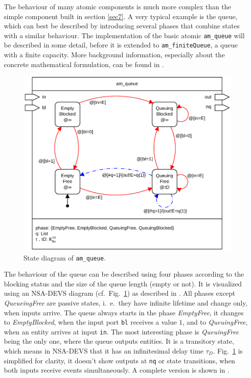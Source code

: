 \documentclass[12pt,oneside,a4paper,bibtotoc,BCOR=0pt,DIV=20]{scrreprt}
\newcommand{\cft}[1]{\mbox{\texttt{#1}}}   %
\begin{document}
The behaviour of many atomic components is much more complex than the simple
component built in section \ref{sec7}. A very typical example is the queue,
which can best be described by introducing several phases that combine states
with a similar behaviour. The implementation of the basic atomic
\cft{am\_queue} will be described in some detail, before it is extended to
\cft{am\_finiteQueue}, a queue with a finite capacity. More background
information, especially about the concrete mathematical formulation, can be
found in \cite{nsaExamples}.

\begin{figure}[ht]
\centering
\includegraphics[width=0.76\columnwidth]{images/bild21.pdf}
\caption{State diagram of \cft{am\_queue}.}
\label{fig_21}
\end{figure}

The behaviour of the queue can be described using four phases according to the
blocking status and the size of the queue length (empty or not). It is
visualized using an NSA-DEVS diagram (cf.\ Fig.\ \ref{fig_21}) as described in
\cite{nsaDiagram}. All phases except \emph{QueueingFree} are passive states,
i.\ e.\ they have infinite lifetime and change only, when inputs arrive. The
queue always starts in the phase \emph{EmptyFree}, it changes to
\emph{EmptyBlocked}, when the input port \cft{bl} receives a value $1$, and to
\emph{QueuingFree}, when an entity arrives at input \cft{in}.  The most
interesting phase is \emph{QueuingFree} being the only one, where the queue
outputs entities. It is a transitory state, which means in NSA-DEVS that it has
an infinitesimal delay time $\tau_D$. Fig.\ \ref{fig_21} is simplified for
clarity, it doesn't show outputs at \cft{nq} or state transitions, when
both inputs receive events simultaneously. A complete version is shown in
\cite{nsaDiagram}.
\end{document}
